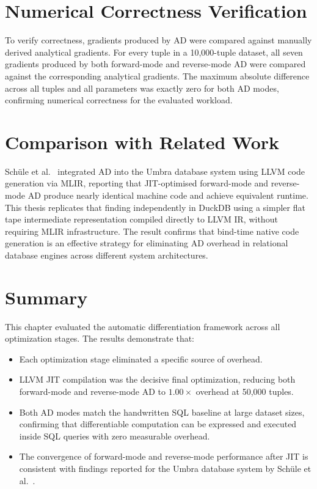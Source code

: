 \documentclass[12pt]{report}
\begin{document}
\section{Numerical Correctness Verification}

To verify correctness, gradients produced by AD were compared against
manually derived analytical gradients. For every tuple in a 10{,}000-tuple
dataset, all seven gradients produced by both forward-mode and reverse-mode
AD were compared against the corresponding analytical gradients. The maximum
absolute difference across all tuples and all parameters was exactly zero for
both AD modes, confirming numerical correctness for the evaluated workload.

\section{Comparison with Related Work}

Schüle et al.~\cite{schule2022llvm} integrated AD into the Umbra database
system using LLVM code generation via MLIR, reporting that JIT-optimised
forward-mode and reverse-mode AD produce nearly identical machine code and
achieve equivalent runtime. This thesis replicates that finding independently
in DuckDB using a simpler flat tape intermediate representation compiled
directly to LLVM IR, without requiring MLIR infrastructure. The result
confirms that bind-time native code generation is an effective strategy for
eliminating AD overhead in relational database engines across different
system architectures.

\section{Summary}

This chapter evaluated the automatic differentiation framework across all
optimization stages. The results demonstrate that:

\begin{itemize}
    \item Each optimization stage eliminated a specific source of overhead.
    \item LLVM JIT compilation was the decisive final optimization, reducing
          both forward-mode and reverse-mode AD to $1.00\times$ overhead at
          50{,}000 tuples.
    \item Both AD modes match the handwritten SQL baseline at large dataset
          sizes, confirming that differentiable computation can be expressed
          and executed inside SQL queries with zero measurable overhead.
    \item The convergence of forward-mode and reverse-mode performance after
          JIT is consistent with findings reported for the Umbra database
          system by Schüle et al.~\cite{schule2022llvm}.
\end{itemize}
\end{document}
